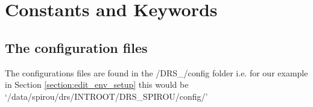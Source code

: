 \chapter{Constants and Keywords}

\newcommand{\calloc}{cal\_loc\_RAW\_spirou.py}
\newcommand{\caldark}{cal\_DARK\_spirou.py}
\newcommand{\calslit}{cal\_SLIT\_spirou.py}
\newcommand{\calff}{cal\_ff\_RAW\_spirou.py}
\newcommand{\calext}{cal\_extract\_RAW\_spirou\definevariable{fiber}.py}
\newcommand{\calextall}{cal\_extract\_RAW\_spirouALL.py}
\newcommand{\hadmricdp}{hadmrICDP\_SPIROU.py}
\newcommand{\kwdrs}{KW\_DRS.py}
\newcommand{\rootdrsloc}{\definevariable{kw\_root\_drs\_loc}}
\newcommand{\rootdrsflat}{\definevariable{kw\_root\_drs\_flat}}
\newcommand{\locofiber}{*\_LOCO\_\definevariable{fiber}*}
\newcommand{\fwhmfiber}{*\_fwhm-order\_\definevariable{fiber}*}


\section{The configuration files}
\label{section:the_config_files}

The configurations files are found in the /DRS\_/config folder i.e. for our example in Section \ref{section:edit_env_setup} this would be `/data/spirou/drs/INTROOT/DRS\_SPIROU/config/'

